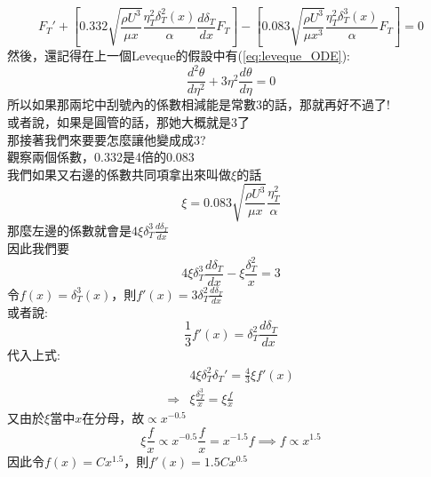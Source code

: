 \documentclass[../main.tex]{subfiles}
\begin{document}
\begin{itemize}
\begin{enumerate}
\begin{equation}
      F_T' + \left[
        0.332\sqrt{
          \frac{\rho U^3}{\mu x}
        }\frac{\eta_T^2\delta_T^2(x)}{\alpha} \frac{d\delta_T}{dx} F_T
      \right]
      - \left[
        0.083 \sqrt{
          \frac{\rho U^3}{\mu x^3}
        } \frac{\eta_T^2 \delta_T^3(x)}{\alpha} F_T
      \right] = 0 \label{eq:graetz_ODE_before_simplify}
    \end{equation}
    然後，還記得在上一個Leveque的假設中有(\ref{eq:leveque_ODE}):
    \begin{equation}
      \frac{d^2 \theta}{d\eta^2} + 3\eta^2 \frac{d\theta}{d\eta} = 0
    \end{equation}
    所以如果那兩坨中刮號內的係數相減能是常數3的話，那就再好不過了!\\
    或者說，如果是圓管的話，那她大概就是3了\\
    那接著我們來要要怎麼讓他變成成3?\\
    觀察兩個係數，0.332是4倍的0.083\\
    我們如果又右邊的係數共同項拿出來叫做$\xi$的話
    \begin{equation}
      \xi = 0.083 \sqrt{
        \frac{\rho U^3}{\mu x}
      } \frac{\eta_T^2}{\alpha}
    \end{equation}
    那麼左邊的係數就會是$4 \xi \delta_T^3 \frac{d\delta_T}{dx}$\\
    因此我們要
    \begin{equation}
      4 \xi \delta_T^3 \frac{d\delta_T}{dx} - \xi\frac{\delta_T^2}{x} = 3
    \end{equation}
    令$f(x)=\delta_T^3(x)$，則$f'(x)=3\delta_T^2 \frac{d\delta_T}{dx}$\\
    或者說:
    \begin{equation}
      \frac{1}{3}f'(x) = \delta_T^2 \frac{d\delta_T}{dx}
    \end{equation}
    代入上式:
    \begin{align}
      & 4 \xi \delta_T^2\delta_T' = \frac{4}{3}\xi f'(x) \nonumber\\
      \Rightarrow & \xi \frac{\delta_T^3}{x} = \xi\frac{f}{x}
    \end{align}
    又由於$\xi$當中$x$在分母，故$\propto x^{-0.5}$
    \begin{equation}
      \xi \frac{f}{x} \propto x^{-0.5} \frac{f}{x}= x^{-1.5} f \implies f \propto x^{1.5}
    \end{equation}
    因此令$f(x) = C x^{1.5}$，則$f'(x) = 1.5 C x^{0.5}$\\

\end{enumerate}
\end{itemize}
\end{document}
